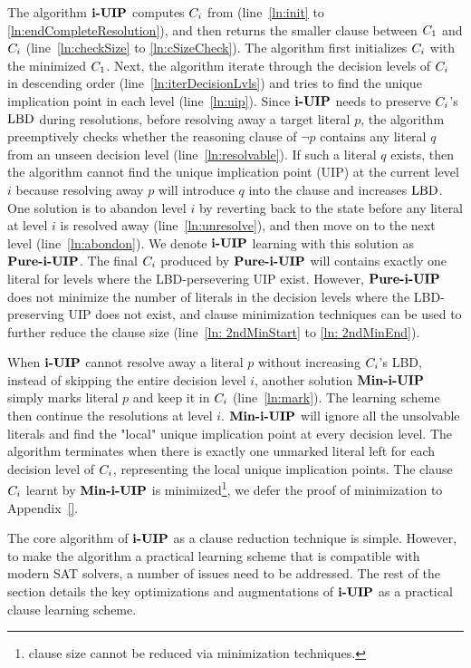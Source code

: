 The algorithm $\textbf{i-UIP}$ computes $C_{i}$ from (line~\ref{ln:init} to \ref{ln:endCompleteResolution}), and then returns the smaller clause between 
$C_{1}$ and $C_{i}$ (line~\ref{ln:checkSize} to \ref{ln:cSizeCheck}). 
The algorithm first initializes $C_{i}$ with the minimized\cite{} $C_{1}$. Next, the algorithm iterate through the decision levels of $C_{i}$ in descending order (line~\ref{ln:iterDecisionLvls}) and tries to find the unique implication point in each level (line~\ref{ln:uip}). Since $\textbf{i-UIP}$ needs to preserve $C_{i}$'s $\text{LBD}$ during resolutions, before resolving away a target literal $p$, the algorithm preemptively checks whether the reasoning clause of $\neg{p}$ contains any literal $q$ from an unseen decision level (line~\ref{ln:resolvable}). If such a literal $q$ exists, then the algorithm cannot find the unique implication point (UIP) at the current level $i$ because resolving away $p$ will introduce $q$ into the clause and increases $\text{LBD}$. One solution is to abandon level $i$ by reverting back to the state before any literal at level $i$ is resolved away (line~\ref{ln:unresolve}), and then move on to the next level (line~\ref{ln:abondon}). We denote $\textbf{i-UIP}$ learning with this solution as $\textbf{Pure-i-UIP}$. The final $C_{i}$ produced by $\textbf{Pure-i-UIP}$ will contains exactly one literal for levels where the LBD-persevering UIP exist. However, $\textbf{Pure-i-UIP}$ does not minimize the number of literals in the decision levels where the LBD-preserving UIP does not exist, and clause minimization techniques\cite{} can be used to further reduce the clause size (line~\ref{ln: 2ndMinStart} to \ref{ln: 2ndMinEnd}). 

  When $\textbf{i-UIP}$ cannot resolve away a literal $p$ without increasing $C_{i}$'s LBD, instead of skipping the entire decision level $i$, another solution $\textbf{Min-i-UIP}$  simply marks literal $p$ and keep it  in $C_{i}$ (line~\ref{ln:mark}). The learning scheme then continue the resolutions at level $i$. $\textbf{Min-i-UIP}$ will ignore all the unsolvable literals and find the "local" unique implication point at every decision level.  The algorithm terminates when there is exactly one unmarked literal left for each decision level of $C_{i}$, representing the local unique implication points. The clause $C_{i}$ learnt by
  $\textbf{Min-i-UIP}$ is minimized\footnote{clause size cannot be reduced via minimization techniques\cite{}.}, we defer the proof of minimization to Appendix~\ref{}.  

The core algorithm of $\textbf{i-UIP}$ as a clause reduction technique is simple. However, to make the algorithm a practical learning scheme that is compatible with modern SAT solvers, a number of issues need to be addressed. The rest of the section details the key optimizations and augmentations of $\textbf{i-UIP}$ as a practical clause learning scheme.

